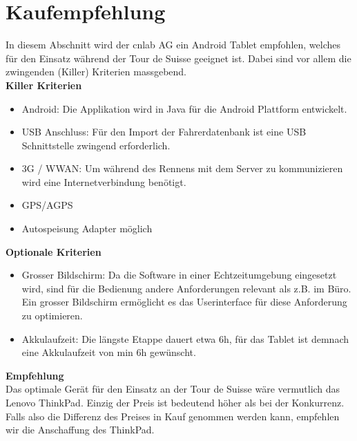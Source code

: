 \section{Kaufempfehlung}
\label{ref:kaufempfehlung}
In diesem Abschnitt wird der cnlab AG ein Android Tablet empfohlen, welches für den Einsatz während der Tour de Suisse geeignet ist. Dabei sind vor allem die zwingenden (Killer) Kriterien massgebend.
\\
\textbf{Killer Kriterien}
\begin{itemize}
\item Android: Die Applikation wird in Java für die Android Plattform entwickelt.
\item USB Anschluss: Für den Import der Fahrerdatenbank ist eine USB Schnittstelle zwingend erforderlich.
\item 3G / WWAN: Um während des Rennens mit dem Server zu kommunizieren wird eine Internetverbindung benötigt.
\item GPS/AGPS
\item Autospeisung Adapter möglich
\end{itemize}

\textbf{Optionale Kriterien}
\begin{itemize}
\item Grosser Bildschirm: Da die Software in einer Echtzeitumgebung eingesetzt wird, sind für die Bedienung andere Anforderungen relevant als z.B. im Büro. Ein grosser Bildschirm ermöglicht es das Userinterface für diese Anforderung zu optimieren.
\item Akkulaufzeit: Die längste Etappe dauert etwa 6h, für das Tablet ist demnach eine Akkulaufzeit von min 6h gewünscht.
\end{itemize}


\textbf{Empfehlung}
\\

Das optimale Gerät für den Einsatz an der Tour de Suisse wäre vermutlich das Lenovo ThinkPad. Einzig der Preis ist bedeutend höher als bei der Konkurrenz. Falls also die Differenz des Preises in Kauf genommen werden kann, empfehlen wir die Anschaffung des ThinkPad.



